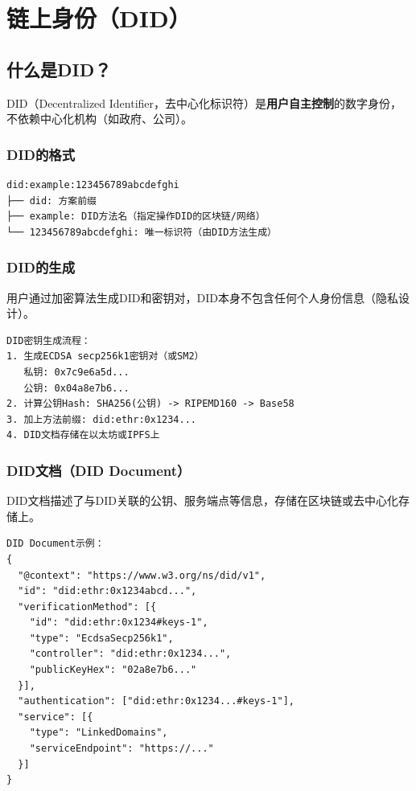 ﻿\documentclass[12pt,a4paper]{article}
\begin{document}
\section{链上身份（DID）}

\subsection{什么是DID？}

DID（Decentralized Identifier，去中心化标识符）是\textbf{用户自主控制}的数字身份，不依赖中心化机构（如政府、公司）。

\subsubsection{DID的格式}

\begin{lstlisting}
did:example:123456789abcdefghi
├── did: 方案前缀
├── example: DID方法名（指定操作DID的区块链/网络）
└── 123456789abcdefghi: 唯一标识符（由DID方法生成）
\end{lstlisting}

\subsubsection{DID的生成}

用户通过加密算法生成DID和密钥对，DID本身不包含任何个人身份信息（隐私设计）。

\begin{lstlisting}
DID密钥生成流程：
1. 生成ECDSA secp256k1密钥对（或SM2）
   私钥: 0x7c9e6a5d...
   公钥: 0x04a8e7b6...
2. 计算公钥Hash: SHA256(公钥) -> RIPEMD160 -> Base58
3. 加上方法前缀: did:ethr:0x1234...
4. DID文档存储在以太坊或IPFS上
\end{lstlisting}

\subsubsection{DID文档（DID Document）}

DID文档描述了与DID关联的公钥、服务端点等信息，存储在区块链或去中心化存储上。

\begin{lstlisting}
DID Document示例：
{
  "@context": "https://www.w3.org/ns/did/v1",
  "id": "did:ethr:0x1234abcd...",
  "verificationMethod": [{
    "id": "did:ethr:0x1234#keys-1",
    "type": "EcdsaSecp256k1",
    "controller": "did:ethr:0x1234...",
    "publicKeyHex": "02a8e7b6..."
  }],
  "authentication": ["did:ethr:0x1234...#keys-1"],
  "service": [{
    "type": "LinkedDomains",
    "serviceEndpoint": "https://..."
  }]
}
\end{lstlisting}
\end{document}
